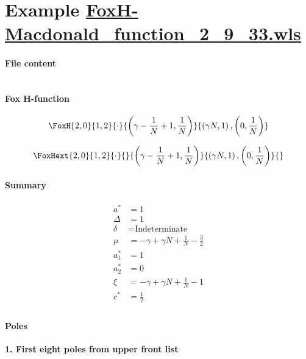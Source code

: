 \documentclass[11pt]{article}
\begin{document}
\section{Example \url{FoxH-Macdonald_function_2_9_33.wls}}

\paragraph{File content}

\inputminted{text}{FoxH-Macdonald_function_2_9_33.wls}

\paragraph{Fox H-function}

\begin{align*}
  \FoxH
    {2,0}
    {1,2}
    {\cdot}
    {\left(\gamma -\frac{1}{N}+1, \frac{1}{N}\right)}
    {\left(\gamma  N, 1\right), \left(0, \frac{1}{N}\right)}
\end{align*}

\begin{align*}
  \FoxHext
    {2,0}
    {1,2}
    {\cdot}
    {}
    {\left(\gamma -\frac{1}{N}+1, \frac{1}{N}\right)}
    {\left(\gamma  N, 1\right), \left(0, \frac{1}{N}\right)}
    {}
\end{align*}

\paragraph{Summary}

\begin{align*}
  a^*    & = 1 \\
  \Delta & = 1 \\
  \delta & = \text{Indeterminate} \\
  \mu    & = -\gamma +\gamma  N+\frac{1}{N}-\frac{3}{2} \\
  a_1^*  & = 1 \\
  a_2^*  & = 0 \\
  \xi    & = -\gamma +\gamma  N+\frac{1}{N}-1 \\
  c^*    & = \frac{1}{2} \\
\end{align*}

\paragraph{Poles}

\noindent\textbf{1. First eight poles from upper front list}
\end{document}
